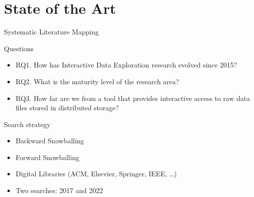\documentclass[10pt]{beamer}
\begin{document}
\section{State of the Art}
\begin{frame}{Systematic Literature Mapping}
\begin{alertblock}{Questions}
    \begin{itemize}
        \item RQ1. How has Interactive Data Exploration research evolved since 2015?
        \item RQ2. What is the maturity level of the research area?
        \item RQ3. How far are we from a tool that provides \alert{interactive} access
            to \alert{raw} data files stored in \alert{distributed} storage?
    \end{itemize}
\end{alertblock}
\begin{block}{Search strategy}
    \begin{itemize}
        \item Backward Snowballing \cite{Idreos2015}
        \item Forward Snowballing
        \item Digital Libraries (ACM, Elsevier, Springer, IEEE, \ldots)
        \item Two searches: 2017 and 2022
    \end{itemize}
\end{block}
\end{frame}
\end{document}
